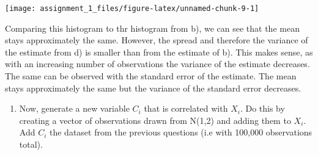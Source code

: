 \documentclass[
]{article}
\providecommand{\tightlist}{%
  \setlength{\itemsep}{0pt}\setlength{\parskip}{0pt}}
\begin{document}
\begin{center}\texttt{[image: assignment\_1\_files/figure-latex/unnamed-chunk-9-1]} \end{center}

\normalsize Comparing this histogram to thr histogram from b), we can
see that the mean stays approximately the same. However, the spread and
therefore the variance of the estimate from d) is smaller than from the
estimate of b). This makes sense, as with an increasing number of
observations the variance of the estimate decreases. The same can be
observed with the standard error of the estimate. The mean stays
approximately the same but the variance of the standard error decreases.

\begin{enumerate}
\def\labelenumi{\alph{enumi}.}
\setcounter{enumi}{4}
\tightlist
\item
  Now, generate a new variable \(C_i\) that is correlated with \(X_i\).
  Do this by creating a vector of observations drawn from N(1,2) and
  adding them to \(X_i\). Add \(C_i\) the dataset from the previous
  questions (i.e with 100,000 observations total).
\end{enumerate}

\small
\end{document}
